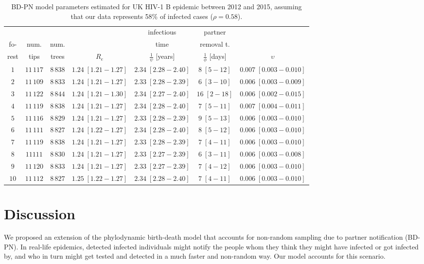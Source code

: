 \documentclass[a4paper,10pt]{article}
\begin{document}
\begin{table}
\caption{BD-PN model parameters estimated for UK HIV-1 B epidemic between 2012 and 2015, assuming that our data represents 58\% of infected cases ($\rho=0.58$).}
\label{tbl:uk}
\begin{tabular}{c|cc|cccc}
&&&&infectious&partner&\\
fo-&num.&num.&&time&removal t.&\\
rest&tips&trees&$R_e$&$\frac{1}{\psi}$ [years]& $\frac{1}{\phi}$ [days]&$\upsilon$\\
\toprule
 $1$ & $11\,117$ & $8\,838$& $1.24\;[1.21-1.27]$& $2.34\;[2.28-2.40]$& $8\;[5-12]$& $0.007\;[0.003-0.010]$ \\
 $2$ & $11\,109$ & $8\,833$& $1.24\;[1.21-1.27]$& $2.33\;[2.28-2.39]$& $6\;[3-10]$& $0.006\;[0.003-0.009]$ \\
 $3$ & $11\,122$ & $8\,844$& $1.24\;[1.21-1.30]$& $2.34\;[2.27-2.40]$& $16\;[2-18]$& $0.006\;[0.002-0.015]$ \\
 $4$ & $11\,119$ & $8\,838$& $1.24\;[1.21-1.27]$& $2.34\;[2.28-2.40]$& $7\;[5-11]$& $0.007\;[0.004-0.011]$ \\
 $5$ & $11\,116$ & $8\,829$&  $1.24\;[1.21-1.27]$& $2.33\;[2.28-2.39]$& $9\;[5-13]$& $0.006\;[0.003-0.010]$ \\
 $6$ & $11\,111$ & $8\,827$&  $1.24\;[1.22-1.27]$& $2.34\;[2.28-2.40]$& $8\;[5-12]$& $0.006\;[0.003-0.010]$ \\
 $7$ & $11\,119$ & $8\,838$& $1.24\;[1.21-1.27]$& $2.33\;[2.28-2.39]$& $7\;[4-11]$& $0.006\;[0.003-0.010]$ \\
 $8$ & $11111$ & $8\,830$& $1.24\;[1.21-1.27]$& $2.33\;[2.27-2.39]$& $6\;[3-11]$& $0.006\;[0.003-0.008]$ \\
 $9$ & $11\,120$ & $8\,833$&  $1.24\;[1.21-1.27]$& $2.33\;[2.27-2.39]$& $7\;[4-12]$& $0.006\;[0.003-0.010]$ \\
 $10$ & $11\,112$ & $8\,827$& $1.25\;[1.22-1.27]$& $2.34\;[2.28-2.40]$& $7\;[4-11]$& $0.006\;[0.003-0.010]$ \\
 \bottomrule
 \end{tabular}
 \end{table}



\section{Discussion}
\label{disc}

We proposed an extension of the phylodynamic birth-death model that accounts for non-random sampling due to partner notification (BD-PN). In real-life epidemics, detected infected individuals might notify the people whom they think they might have infected or got infected by, and who in turn might get tested and detected in a much faster and non-random way. Our model accounts for this scenario.
\end{document}
